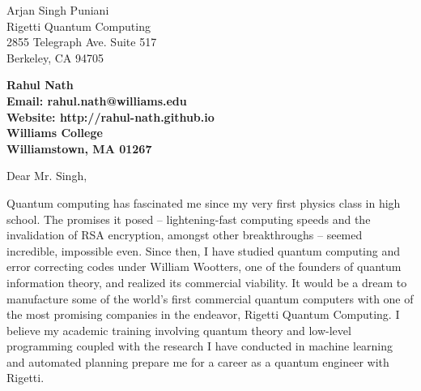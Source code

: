 \documentclass[11pt]{letter} %
\newcommand{\forceindent}{\leavevmode{\parindent=24pt\indent}}
\begin{document}

\begin{letter}{Arjan Singh Puniani \\
Rigetti Quantum Computing \\
2855 Telegraph Ave. Suite 517\\
Berkeley, CA 94705} 


\begin{center}
\large\bf Rahul Nath \\ %
Email: rahul.nath@williams.edu \\ Website: http://rahul-nath.github.io \\ Williams College \\ Williamstown, MA 01267
\end{center}


\opening{Dear Mr. Singh,}

\forceindent Quantum computing has fascinated me since my very first physics class in high school. The promises it posed -- lightening-fast computing speeds and the invalidation of RSA encryption, amongst other breakthroughs -- seemed incredible, impossible even. Since then, I have studied quantum computing and error correcting codes under William Wootters, one of the founders of quantum information theory, and realized its commercial viability. It would be a dream to manufacture some of the world's first commercial quantum computers with one of the most promising companies in the endeavor, Rigetti Quantum Computing. I believe my academic training involving quantum theory and low-level programming coupled with the research I have conducted in machine learning and automated planning prepare me for a career as a quantum engineer with Rigetti.


\end{letter}
\end{document}
